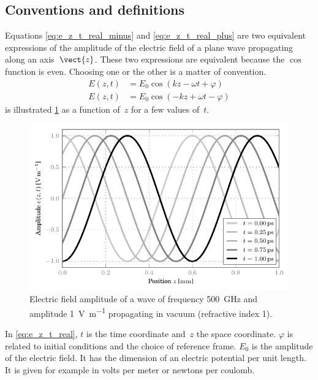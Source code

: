 \subsection{Conventions and definitions}
Equations \eqref{eq:e_z_t_real_minus} and \eqref{eq:e_z_t_real_plus} are two equivalent expressions of the amplitude of the electric field of a plane wave propagating along an axis~$\vect{z}$.
These two expressions are equivalent because the $\cos$ function is even.
Choosing one or the other is a matter of convention.
\begin{subequations}
    \begin{align}
       E(z, t) &= E_0 \cos( kz - \omega t + \varphi)   \label{eq:e_z_t_real_minus} \\
       E(z, t) &= E_0 \cos(-kz + \omega t - \varphi)   \label{eq:e_z_t_real_plus}
    \end{align}
    \label{eq:e_z_t_real}
\end{subequations}
 is illustrated \cref{fig:plane_wave_propagation} as a function of~$z$ for a few values of~$t$.
\begin{figure}[hbp]
    \centering
    \includegraphics{plane_wave_propagation}
    \caption {\label{fig:plane_wave_propagation}Electric field amplitude of a wave of frequency \SI{500}{\giga\hertz} and amplitude \SI{1}{\volt\per\meter} propagating in vacuum (refractive index 1).}
\end{figure}

In \cref{eq:e_z_t_real}, $t$ is the time coordinate and~$z$ the space coordinate.
$\varphi$ is related to initial conditions and the choice of reference frame.
$E_0$ is the amplitude of the electric field.
It has the dimension of an electric potential per unit length.
It is given for example in volts per meter or newtons per coulomb.

